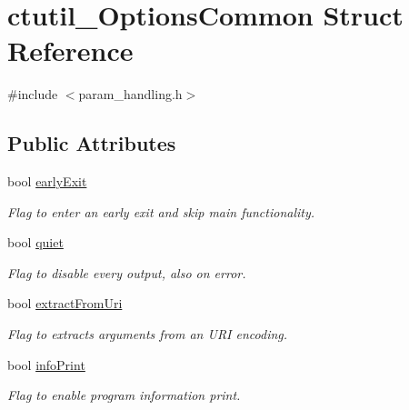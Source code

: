 \hypertarget{structctutil__OptionsCommon}{}\section{ctutil\+\_\+\+Options\+Common Struct Reference}
\label{structctutil__OptionsCommon}


{\ttfamily \#include $<$param\+\_\+handling.\+h$>$}

\subsection*{Public Attributes}
\begin{DoxyCompactItemize}
\item 
\hypertarget{structctutil__OptionsCommon_a97a6998bbcee0ad257a7dc12712c189f}{}\label{structctutil__OptionsCommon_a97a6998bbcee0ad257a7dc12712c189f} 
bool \hyperlink{structctutil__OptionsCommon_a97a6998bbcee0ad257a7dc12712c189f}{early\+Exit}
\begin{DoxyCompactList}\small\item\em Flag to enter an early exit and skip main functionality. \end{DoxyCompactList}\item 
\hypertarget{structctutil__OptionsCommon_afbd862e0c1984b8e30e1387cc2118470}{}\label{structctutil__OptionsCommon_afbd862e0c1984b8e30e1387cc2118470} 
bool \hyperlink{structctutil__OptionsCommon_afbd862e0c1984b8e30e1387cc2118470}{quiet}
\begin{DoxyCompactList}\small\item\em Flag to disable every output, also on error. \end{DoxyCompactList}\item 
\hypertarget{structctutil__OptionsCommon_a6bf54911c48b839695dbfdfa2e4dc80b}{}\label{structctutil__OptionsCommon_a6bf54911c48b839695dbfdfa2e4dc80b} 
bool \hyperlink{structctutil__OptionsCommon_a6bf54911c48b839695dbfdfa2e4dc80b}{extract\+From\+Uri}
\begin{DoxyCompactList}\small\item\em Flag to extracts arguments from an U\+RI encoding. \end{DoxyCompactList}\item 
\hypertarget{structctutil__OptionsCommon_ae836d9cf56007a22a079270167b77c53}{}\label{structctutil__OptionsCommon_ae836d9cf56007a22a079270167b77c53} 
bool \hyperlink{structctutil__OptionsCommon_ae836d9cf56007a22a079270167b77c53}{info\+Print}
\begin{DoxyCompactList}\small\item\em Flag to enable program information print. \end{DoxyCompactList}\item 

\end{DoxyCompactItemize}
